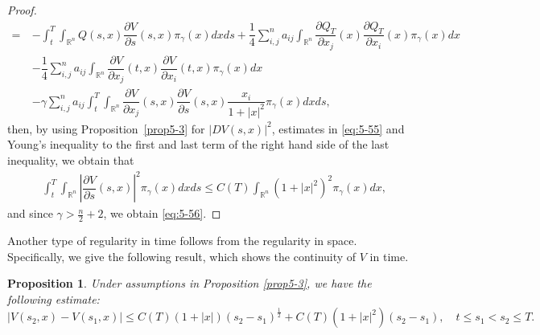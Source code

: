 \documentclass[11pt]{article}
\numberwithin{equation}{section}
\newtheorem{proposition}[theorem]{Proposition}
\newcommand{\brn}{{\mathbb{R}^n}}
\newcommand{\1}{\mbox{1\hspace{-1mm}I}}
\begin{document}
\begin{proof}
\begin{align*}
    =\ & -\int_{t}^{T}\int_{\brn}Q(s,x)\dfrac{\partial V}{\partial s}(s,x)\pi_{\gamma}(x)dxds +\dfrac{1}{4}\sum_{i,j}^n a_{ij}\int_{\brn}\dfrac{\partial Q_{T}}{\partial x_{j}}(x)\dfrac{\partial Q_{T}}{\partial x_{i}}(x)\pi_{\gamma}(x)dx \\
    &  - \dfrac{1}{4}\sum_{i,j}^n a_{ij}\int_{\brn}\dfrac{\partial V}{\partial x_{j}}(t,x)\dfrac{\partial V}{\partial x_{i}}(t,x)\pi_{\gamma}(x)dx \\
    &-\gamma\sum_{i,j}^n a_{ij}\int_{t}^{T}\int_{\brn}\dfrac{\partial V}{\partial x_{j}}(s,x)\dfrac{\partial V}{\partial s}(s,x)\dfrac{x_{i}}{1+|x|^{2}}\pi_{\gamma}(x)dxds,
\end{align*}
then, by using Proposition~\ref{prop5-3} for $|DV(s,x)|^2$, estimates in \eqref{eq:5-55} and Young's inequality to the first and last term of the right hand side of the last inequality, %
we obtain that
\begin{align*}
    &\int_{t}^{T}\int_{\brn}\left|\dfrac{\partial V}{\partial s}(s,x)\right|^{2}\pi_{\gamma}(x)dxds\leq C(T)\int_{\brn}\left(1+|x|^{2}\right)^{2}\pi_{\gamma}(x)dx,
\end{align*}
and since $\gamma>\frac{n}{2}+2$, we obtain \eqref{eq:5-56}. 
\end{proof}

Another type of regularity in time follows from the regularity in space. Specifically, we give the following result, which shows the continuity of $V$ in time.

\begin{proposition}\label{prop:5-5}
Under assumptions in Proposition \ref{prop5-3}, we have the following estimate:
\begin{equation}\label{eq:5-500}
    \left|V\left(s_{2},x\right)-V\left(s_{1},x\right)\right|\le C(T)(1+|x|)\left(s_{2}-s_{1}\right)^{\frac{1}{2}}+C(T)(1+|x|^{2})\left(s_{2}-s_{1}\right),\quad t\le s_{1}<s_{2}\le T.
\end{equation}
\end{proposition}
\end{document}
